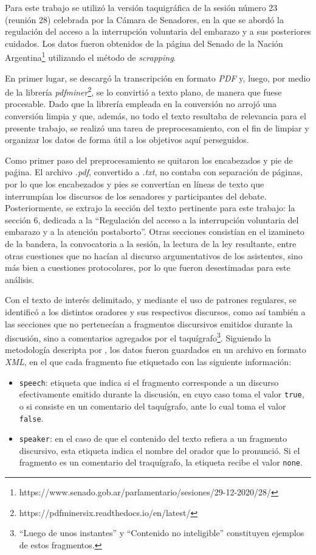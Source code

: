 Para este trabajo se utilizó la versión taquigráfica de la sesión número
23 (reunión 28) celebrada por la Cámara de Senadores, en la que se abordó la
regulación del acceso a la interrupción voluntaria del embarazo y a sus
posteriores cuidados. Los datos fueron obtenidos de la página del Senado de la Nación
Argentina\footnote{https://www.senado.gob.ar/parlamentario/sesiones/29-12-2020/28/}
utilizando el método de \textit{scrapping}.\par
En primer lugar, se descargó la transcripción en formato \textit{PDF} y, luego, por
medio de la librería \textit{pdfminer}\footnote{https://pdfminersix.readthedocs.io/en/latest/},
se lo convirtió a texto plano, de manera que fuese procesable. Dado que la librería
empleada en la conversión no arrojó una conversión limpia y que, además, no todo el texto
resultaba de relevancia para el presente trabajo, se realizó una tarea de
preprocesamiento, con el fin de limpiar y organizar los datos de forma útil a los
objetivos aquí perseguidos.\par
Como primer paso del preprocesamiento se quitaron los encabezados y pie de paǵina.
El archivo \textit{.pdf}, convertido a \textit{.txt}, no contaba con separación de
páginas, por lo que los encabezados y pies se convertían en líneas de texto que
interrumpían los discursos de los senadores y participantes del debate.
Posteriormente, se extrajo la sección del texto pertinente para este trabajo:
la sección 6, dedicada a la ``Regulación  del  acceso  a  la  interrupción
voluntaria  del  embarazo  y  a  la atención postaborto''. Otras secciones consistían
en el izamineto de la bandera, la convocatoria a la sesión, la lectura de la ley
resultante, entre otras cuestiones que no hacían al discurso argumentativos de los
asistentes, sino más bien a cuestiones protocolares, por lo que fueron desestimadas
para este análisis.\par
Con el texto de interés delimitado, y mediante el uso de patrones regulares, se
identificó a los distintos oradores y sus respectivos discursos, como así también
a las secciones que no pertenecían a fragmentos discursivos emitidos durante la
discusión, sino a comentarios agregados por el taquígrafo\footnote{``Luego de unos
instantes'' y ``Contenido no inteligible'' constituyen ejemplos de estos
fragmentos.}. Siguiendo la metodología descripta por \cite{monroe2008fightin},
los datos fueron guardados en un archivo en formato \textit{XML}, en el que
cada fragmento fue etiquetado con las siguiente información:
\begin{itemize}
    \item \texttt{speech}: etiqueta que indica si el fragmento corresponde a un
    discurso efectivamente emitido durante la discusión, en cuyo caso toma el
    valor \texttt{true}, o si consiste en un comentario del taquígrafo, ante lo cual
    toma el valor \texttt{false}.
    \item \texttt{speaker}: en el caso de que el contenido del texto refiera a
    un fragmento discursivo, esta etiqueta indica el nombre del orador que lo
    pronunció. Si el fragmento es un comentario del traquígrafo, la etiqueta
    recibe el valor \texttt{none}.
\end{itemize}
